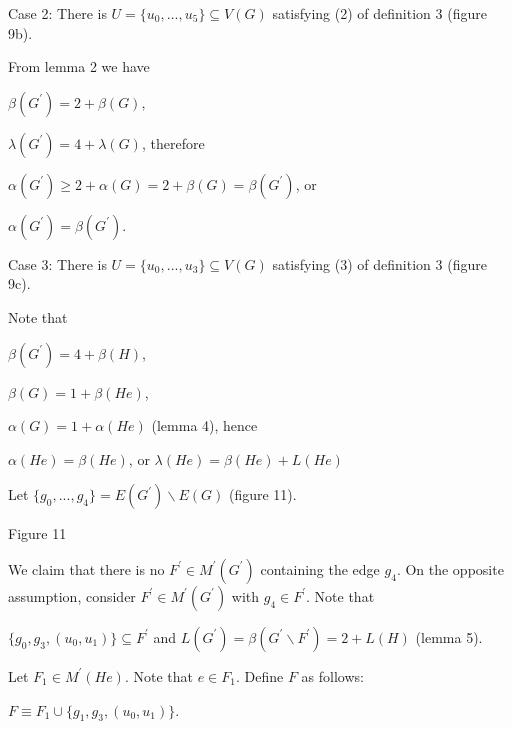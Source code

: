 \documentclass{article}
\begin{document}
Case 2: There is $U=\{u_{0},...,u_{5}\}\subseteq V(G)$ satisfying (2) of
definition 3 (figure 9b).

From lemma 2 we have

\begin{center}
$\beta (G^{\prime })=2+\beta (G)$,

$\lambda (G^{\prime })=4+\lambda (G)$, therefore

$\alpha (G^{\prime })\geq 2+\alpha (G)=2+\beta (G)=\beta (G^{\prime })$, or

$\alpha (G^{\prime })=\beta (G^{\prime })$.
\end{center}

Case 3: There is $U=\{u_{0},...,u_{3}\}\subseteq V(G)$ satisfying (3) of
definition 3 (figure 9c).

Note that

\begin{center}
$\beta (G^{\prime })=4+\beta (H)$,

$\beta (G)=1+\beta (He)$,

$\alpha (G)=1+\alpha (He)$ (lemma 4), hence

$\alpha (He)=\beta (He)$, or $\lambda (He)=\beta (He)+L(He)$
\end{center}

Let $\{g_{0},...,g_{4}\}=E(G^{\prime })\backslash E(G)$ (figure 11).

\begin{center}

Figure 11\bigskip
\end{center}

We claim that there is no $F^{\prime }\in M^{\prime }(G^{\prime })$
containing the edge $g_{4}$. On the opposite assumption, consider $F^{\prime
}\in M^{\prime }(G^{\prime })$ with $g_{4}\in F^{\prime }$. Note that

\begin{center}
$\{g_{0},g_{3},(u_{0},u_{1})\}\subseteq F^{\prime }$ and $L(G^{\prime
})=\beta (G^{\prime }\backslash F^{\prime })=2+L(H)$ (lemma 5).
\end{center}

Let $F_{1}\in M^{\prime }(He)$. Note that $e\in F_{1}$. Define $F$ as
follows:

\begin{center}
$F\equiv F_{1}\cup \{g_{1},g_{3},(u_{0},u_{1})\}$.
\end{center}
\end{document}
